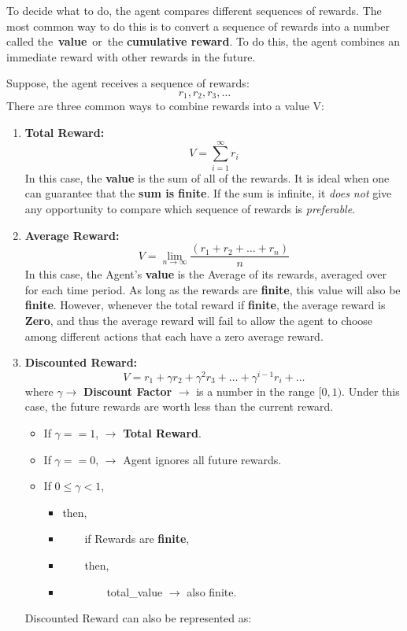 To decide what to do, the agent compares different sequences of rewards. The most common way to do this is to convert a sequence of rewards into a number called the \textbf{value} or the
\textbf{cumulative reward}.
To do this, the agent combines an immediate reward with other rewards in the future.

Suppose, the agent receives a sequence of rewards:
$$r_1,r_2,r_3,\dots$$
There are three common ways to combine rewards into a value V:
\begin{enumerate}[leftmargin=*]
%
\item %
    \textbf{Total Reward:}
    $$V = \sum_{i=1}^{\infty} r_i$$
    In this case, the \textbf{value} is the sum of all of the rewards. It is ideal when one can guarantee that the \textbf{sum is finite}.
    If the sum is infinite, it \textit{does not} give any opportunity to compare which sequence of rewards is \textit{preferable}.
%
\item %
    \textbf{Average Reward:}
    $$V = \lim_{n \rightarrow \infty}\frac{(r_1+r_2+\dots + r_n)}{n}$$
    In this case, the Agent's \textbf{value} is the Average of its rewards, averaged over for each time period. As long as the rewards are \textbf{finite}, this value will also be \textbf{finite}.
    However, whenever the total reward if \textbf{finite}, the average reward is \textbf{Zero}, and thus the average reward will fail to allow the agent to choose among different actions that each have a zero average reward. 
%
\item %
    \textbf{Discounted Reward:}
    $$
    V = r_1+\gamma r_2 + \gamma^2r_3 + \dots + \gamma^{i-1}r_i + \dots
    $$
    where $\gamma \rightarrow$ \textbf{Discount Factor} $\rightarrow$ is a number in the range $[0, 1)$. Under this case, the future rewards are worth less than the current reward.
  \begin{itemize}
		  \item If $\gamma == 1$, $\rightarrow$ \textbf{Total Reward}.
		  \item If $\gamma == 0$, $\rightarrow$ Agent ignores all future rewards.
		  \item If $0 \leq \gamma < 1$,
            \begin{itemize}
				\item[] then,
				\item[] \ \ \ \ if Rewards are \textbf{finite},
				\item[] \ \ \ \ then,
				\item[] \ \ \ \ \ \ \ \ total\_value $\rightarrow$ also finite.
            \end{itemize}
  \end{itemize}
Discounted Reward can also be represented as:


\end{enumerate}

